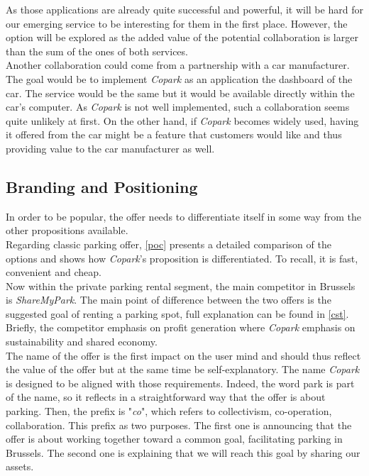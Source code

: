 \documentclass[12pt,a4paper,oneside]{book}
\newcommand{\bp}{\textit{Copark}}
\begin{document}
As those applications are already quite successful and powerful, it will be hard for our emerging service to be interesting for them in the first place. However, the option will be explored as the added value of the potential collaboration is larger than the sum of the ones of both services.\\

Another collaboration could come from a partnership with a car manufacturer. The goal would be to implement \bp{} as an application the dashboard of the car. The service would be the same but it would be available directly within the car's computer. As \bp{} is not well implemented, such a collaboration seems quite unlikely at first. On the other hand, if \bp{} becomes widely used, having it offered from the car might be a feature that customers would like and thus providing value to the car manufacturer as well.

\subsection{Branding and Positioning}

In order to be popular, the offer needs to differentiate itself in some way from the other propositions available.\\

Regarding classic parking offer, \autoref{poc} presents a detailed comparison of the options and shows how \bp{}'s proposition is differentiated. To recall, it is fast, convenient and cheap.\\

Now within the private parking rental segment, the main competitor in Brussels is \textit{ShareMyPark}. The main point of difference between the two offers is the suggested goal of renting a parking spot, full explanation can be found in \autoref{cst}. Briefly, the competitor emphasis on profit generation where \bp{} emphasis on sustainability and shared economy.\\

The name of the offer is the first impact on the user mind and should thus reflect the value of the offer but at the same time be self-explanatory. The name \bp{} is designed to be aligned with those requirements. Indeed, the word park is part of the name, so it reflects in a straightforward way that the offer is about parking. Then, the prefix is "\textit{co}", which refers to collectivism, co-operation, collaboration. This prefix as two purposes. The first one is announcing that the offer is about working together toward a common goal, facilitating parking in Brussels. The second one is explaining that we will reach this goal by sharing our assets.\\
\end{document}

